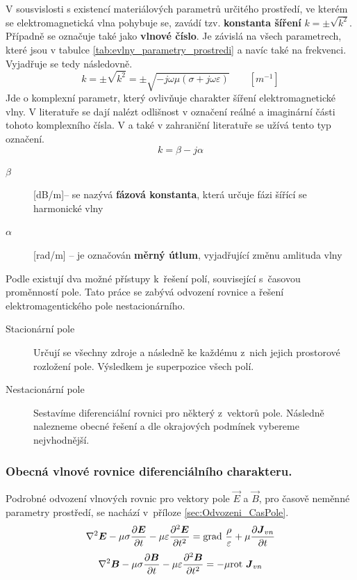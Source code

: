 V sousvislosti s existencí materiálových parametrů určitého prostředí, ve kterém se elektromagnetická vlna pohybuje se, zavádí tzv. {\bf konstanta šíření} $k=\pm \sqrt{k^{2}}$. Případně se označuje také jako {\bf vlnové číslo}. Je závislá na všech parametrech, které jsou v tabulce \ref{tab:evlny_parametry_prostredi} a navíc také na frekvenci. Vyjadřuje se tedy následovně.
\begin{displaymath}
	k=\pm \sqrt{k^{2}}=\pm\sqrt{-j\omega\mu(\sigma+j\omega\varepsilon)}\qquad [m^{-1}]
\end{displaymath}
Jde o komplexní parametr, který ovlivňuje charakter šíření elektromagnetické vlny. V literatuře se dají nalézt odlišnost v označení reálné a imaginární  části tohoto komplexního čísla. V \cite{emp} a také v zahraniční literatuře se užívá tento typ označení. 
\begin{equation}
	k = \beta - j\alpha
	\label{rce:evlny_alphabeta}
\end{equation}
\begin{description}
\item[$\beta$] [dB/m]-- se nazývá {\bf fázová konstanta}, která určuje fázi šířící se harmonické vlny
\item[$\alpha$] [rad/m] -- je označován {\bf měrný útlum}, vyjadřující změnu amlituda vlny
\end{description}

Podle \cite[str. 33]{emp} existují dva možné přístupy k~řešení polí, související s~časovou proměnností pole. Tato práce se zabývá odvození rovnice a řešení elektromagentického pole nestacionárního.
\begin{description}
\item[Stacionární pole]Určují se všechny zdroje a následně ke každému z~nich jejich prostorové rozložení pole. Výsledkem je superpozice všech polí.
\item[Nestacionární pole]Sestavíme diferenciální rovnici pro některý z~vektorů pole. Následně nalezneme obecné řešení a dle okrajových podmínek vybereme nejvhodnější. 
\end{description}


\subsubsection*{Obecná vlnové rovnice diferenciálního charakteru.}
 Podrobné odvození vlnových rovnic pro vektory pole $\vec E$ a $\vec B$, pro časově neměnné parametry prostředí, se nachází v~příloze \ref{sec:Odvozeni_CasPole}.
\begin{equation}
	\nabla^{2}\mbox{\boldmath$E$} -\mu\sigma\frac{\partial\mbox{\boldmath$E$}}{\partial t}-\mu\varepsilon\frac{\partial^{2}\mbox{\boldmath$E$}}{\partial t^{2}} = \mathrm{grad}\ \frac{\rho}{\varepsilon}+\mu\frac{\partial\mbox{\boldmath$J$}_{vn}}{\partial t}
	\label{rce:evlny_VlnR_ElPole}
\end{equation}
\begin{equation}
	\nabla^{2}\mbox{\boldmath$B$} -\mu\sigma\frac{\partial\mbox{\boldmath$B$}}{\partial t}-\mu\varepsilon\frac{\partial^{2}\mbox{\boldmath$B$}}{\partial t^{2}}= -\mu\mathrm{rot}\ \mbox{\boldmath$J$}_{vn}
	\label{rce:evlny_VlnR_MagPole}
\end{equation}

